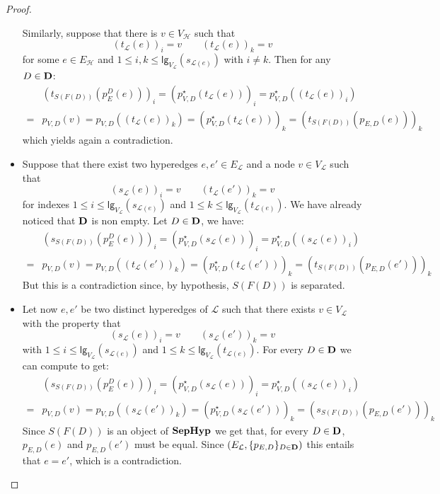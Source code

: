 \documentclass[3p]{elsarticle}
\newcommand{\lgh}{\mathsf{lg}}
\def\D{\textbf {\textup{D}}}
\newcommand{\catname}[1]{\textbf{\textup{#1}}}
\newcommand{\shyp}{\catname{SepHyp}}
\theoremstyle{remark}
\theoremstyle{definition}
\begin{document}
\begin{proof}
\begin{itemize}
		
		Similarly, suppose that there is $v\in V_{\mathcal{H}}$ such that
			\[(t_{\mathcal{L}}(e))_i=v \qquad  (t_{\mathcal{L}}(e) )_k= v\]
			for some $e\in E_{\mathcal{H}}$ and $1\leq i, k \leq \lgh_{V_{\mathcal{L}}}(s_{\mathcal{L}(e)})$ with $i\neq k$. Then for any $D\in \D$:
			\begin{align*}
				&(t_{S(F(D))}( p^D_{E}(e)))_i = ( p^\star_{V,D}(t_{\mathcal{L}}(e)))_i=p^\star_{V, D}((t_{\mathcal{L}}(e))_i)\\=&p_{V,D}(v)=p_{V, D}((t_{\mathcal{L}}(e))_k)=(p^\star_{V,D}(t_{\mathcal{L}}(e)))_k=(t_{S(F(D))}( p_{E,D}(e)))_k  	
			\end{align*}
			which yields again a contradiction.
		\item Suppose that there exist two hyperedges $e, e'\in E_{\mathcal{L}}$ and  a node $v\in V_{\mathcal{L}}$ such that \[(s_{\mathcal{L}}(e))_i=v \qquad  (t_{\mathcal{L}}(e') )_k= v\]
		for indexes $1\leq i \leq \lgh_{V_{\mathcal{L}}}(s_{\mathcal{L}(e)})$ and $1\leq k \leq \lgh_{V_{\mathcal{L}}}(t_{\mathcal{L}(e)}) $. We have already noticed that $\D$ is non empty. Let $D\in \D$, we have:
		\begin{align*}&(s_{S(F(D))}( p^D_{E}(e)))_i = ( p^\star_{V,D}(s_{\mathcal{L}}(e)))_i=p^\star_{V, D}((s_{\mathcal{L}}(e))_i)\\=&p_{V,D}(v)=p_{V, D}((t_{\mathcal{L}}(e'))_k)=(p^\star_{V,D}(t_{\mathcal{L}}(e')))_k=(t_{S(F(D))}( p_{E,D}(e')))_k  	
		\end{align*}
		But this is a contradiction since, by hypothesis, $S(F(D))$ is separated. 
		\item Let now $e, e'$ be two distinct hyperedges of $\mathcal{L}$ such that there exists $v\in V_{\mathcal{L}}$ with the property that 
		 \[(s_{\mathcal{L}}(e))_i=v \qquad  (s_{\mathcal{L}}(e') )_k= v\]
		with $1\leq i \leq \lgh_{V_{\mathcal{L}}}(s_{\mathcal{L}(e)})$ and $1\leq k \leq \lgh_{V_{\mathcal{L}}}(t_{\mathcal{L}(e)}) $. For every $D\in \D$ we can compute to get:
		\begin{align*}&(s_{S(F(D))}( p^D_{E}(e)))_i = ( p^\star_{V,D}(s_{\mathcal{L}}(e)))_i=p^\star_{V, D}((s_{\mathcal{L}}(e))_i)\\=&p_{V,D}(v)=p_{V, D}((s_{\mathcal{L}}(e'))_k)=(p^\star_{V,D}(s_{\mathcal{L}}(e')))_k=(s_{S(F(D))}( p_{E,D}(e')))_k  	
		\end{align*}
		Since $S(F(D))$ is an object of $\shyp$ we get that, for every $D\in \D$,  $p_{E,D}(e)$ and $p_{E,D}(e')$ must be equal.  Since $(E_\mathcal{L}, \{p_{E, D}\}_{D\in \D})$ this entails that $e = e'$, which is a contradiction.

\end{itemize}
\end{proof}
\end{document}
